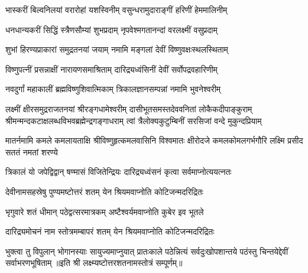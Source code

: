 \twolineshloka
{भास्करीं बिल्वनिलयां वरारोहां यशस्विनीम्}
{वसुन्धरामुदाराङ्गीं हरिणीं हेममालिनीम्}

\twolineshloka
{धनधान्यकरीं सिद्धिं स्त्रैणसौम्यां शुभप्रदाम्}
{नृपवेश्मगतानन्दां वरलक्ष्मीं वसुप्रदाम्}

\twolineshloka
{शुभां हिरण्यप्राकारां समुद्रतनयां जयाम्}
{नमामि मङ्गलां देवीं विष्णुवक्षःस्थलस्थिताम्}

\twolineshloka
{विष्णुपत्नीं प्रसन्नाक्षीं नारायणसमाश्रिताम्}
{दारिद्र्यध्वंसिनीं देवीं सर्वोपद्रवहारिणीम्}

\twolineshloka
{नवदुर्गां महाकालीं ब्रह्मविष्णुशिवात्मिकाम्}
{त्रिकालज्ञानसम्पन्नां नमामि भुवनेश्वरीम्}

\fourlineindentedshloka
{लक्ष्मीं क्षीरसमुद्रराजतनयां श्रीरङ्गधामेश्वरीम्}
{दासीभूतसमस्तदेववनितां लोकैकदीपाङ्कुराम्}
{श्रीमन्मन्दकटाक्षलब्धविभवब्रह्मेन्द्रगङ्गाधराम्}
{त्वां त्रैलोक्यकुटुम्बिनीं सरसिजां वन्दे मुकुन्दप्रियाम्}

\fourlineindentedshloka
{मातर्नमामि कमले कमलायताक्षि}
{श्रीविष्णुहृत्कमलवासिनि विश्वमातः}
{क्षीरोदजे कमलकोमलगर्भगौरि}
{लक्ष्मि प्रसीद सततं नमतां शरण्ये}

\twolineshloka
{त्रिकालं यो जपेद्विद्वान् षण्मासं विजितेन्द्रियः}
{दारिद्र्यध्वंसनं कृत्वा सर्वमाप्नोत्ययत्नतः}

\twolineshloka
{देवीनामसहस्रेषु पुण्यमष्टोत्तरं शतम्}
{येन श्रियमवाप्नोति कोटिजन्मदरिद्रितः}

\twolineshloka
{भृगुवारे शतं धीमान् पठेद्वत्सरमात्रकम्}
{अष्टैश्वर्यमवाप्नोति कुबेर इव भूतले}

\twolineshloka
{दारिद्र्यमोचनं नाम स्तोत्रमम्बापरं शतम्}
{येन श्रियमवाप्नोति कोटिजन्मदरिद्रितः}

\threelineshloka
{भुक्त्वा तु विपुलान् भोगानस्याः सायुज्यमाप्नुयात्}
{प्रातःकाले पठेन्नित्यं सर्वदुःखोपशान्तये}
{पठंस्तु चिन्तयेद्देवीं सर्वाभरणभूषिताम्}
॥इति श्री लक्ष्म्यष्टोत्तरशतनामस्तोत्रं सम्पूर्णम्॥